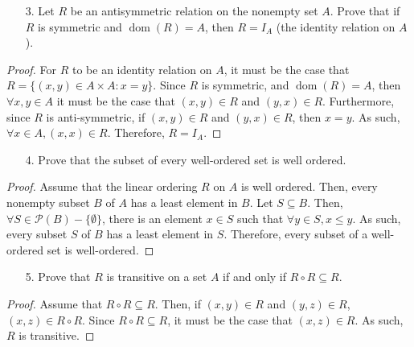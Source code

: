 \documentclass[10pt]{article}
\theoremstyle{definition}
\theoremstyle{plain}
\DeclareMathOperator\dom{dom}
\begin{document}
\pagebreak



\begin{enumerate}
  \item[3.] Let $R$ be an antisymmetric relation on the nonempty set $A$.  Prove that if $R$ is symmetric and $\dom(R) = A$, then $R = I_A$ (the identity relation on $A$).
\end{enumerate}

\setcounter{equation}{0}
\begin{proof}
  For $R$ to be an identity relation on $A$, it must be the case that $R = \{(x,y)\in A \times A : x = y\}$. Since $R$ is symmetric, and $\dom(R)=A$, then $\forall x,y \in A$ it must be the case that $(x,y)\in R$ and $(y,x)\in R$. Furthermore, since $R$ is anti-symmetric, if $(x,y)\in R$ and $(y,x) \in R$, then $x=y$. As such, $\forall x \in A, (x,x) \in R$. Therefore, $R = I_A$.
\end{proof}



\pagebreak



\begin{enumerate}
  \item[4.] Prove that the subset of every well-ordered set is well ordered.
\end{enumerate}

\setcounter{equation}{0}
\begin{proof}
  Assume that the linear ordering $R$ on $A$ is well ordered. Then, every nonempty subset $B$ of $A$ has a least element in $B$. Let $S\subseteq B$. Then, $\forall S\in \mathcal{P}(B) - \{\emptyset\}$, there is an element $x\in S$ such that $\forall y \in S, x\leq y$. As such, every subset $S$ of $B$ has a least element in $S$. Therefore, every subset of a well-ordered set is well-ordered.
\end{proof}



\pagebreak



\begin{enumerate}
  \item[5.] Prove that $R$ is transitive on a set $A$ if and only if $R \circ R \subseteq R$.
\end{enumerate}

\setcounter{equation}{0}
\begin{proof}
  Assume that $R \circ R \subseteq R$. Then, if $(x,y)\in R$ and $(y,z)\in R$, $(x,z)\in R \circ R$. Since $R \circ R \subseteq R$, it must be the case that $(x,z)\in R$. As such, $R$ is transitive.
\end{proof}
\end{document}
